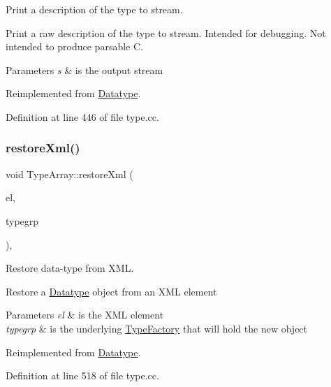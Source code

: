 Print a description of the type to stream. 

Print a raw description of the type to stream. Intended for debugging. Not intended to produce parsable C. 
\begin{DoxyParams}{Parameters}
{\em s} & is the output stream \\
\hline
\end{DoxyParams}


Reimplemented from \mbox{\hyperlink{class_datatype_a034a9b665df1a06f17fd3dfe61e7bf41}{Datatype}}.



Definition at line 446 of file type.\+cc.

\mbox{\label{class_type_array_a3f933b477f4089344f7a58ef67aa6ee1}} 
\subsubsection{\texorpdfstring{restoreXml()}{restoreXml()}}
{\footnotesize\ttfamily void Type\+Array\+::restore\+Xml (\begin{DoxyParamCaption}\item[{const \mbox{\hyperlink{class_element}{Element}} $\ast$}]{el,  }\item[{\mbox{\hyperlink{class_type_factory}{Type\+Factory}} \&}]{typegrp }\end{DoxyParamCaption})\hspace{0.3cm}{\ttfamily [protected]}, {\ttfamily [virtual]}}



Restore data-\/type from X\+ML. 

Restore a \mbox{\hyperlink{class_datatype}{Datatype}} object from an X\+ML element 
\begin{DoxyParams}{Parameters}
{\em el} & is the X\+ML element \\
\hline
{\em typegrp} & is the underlying \mbox{\hyperlink{class_type_factory}{Type\+Factory}} that will hold the new object \\
\hline
\end{DoxyParams}


Reimplemented from \mbox{\hyperlink{class_datatype_aed882ae693a31a64d56fffb9abdaa575}{Datatype}}.



Definition at line 518 of file type.\+cc.

